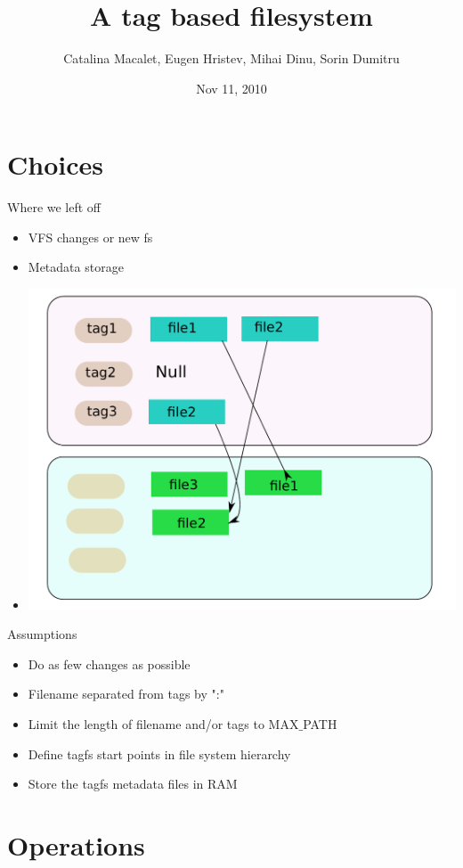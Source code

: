 \documentclass{beamer}
\title[TagFS]{A tag based filesystem}
\author{Catalina Macalet, Eugen Hristev, Mihai Dinu, Sorin Dumitru}
\institute{Politehnic University of Bucharest}
\date{Nov 11, 2010}
\begin{document}
\begin{frame}
  \titlepage
\end{frame}

\section{Choices}

\begin{frame}{Where we left off}
    \begin{itemize}
        \item{VFS changes or new fs}
        \item{Metadata storage}
	\item{\includegraphics[scale=0.4]{poza.pdf}}
    \end{itemize}
\end{frame}

\begin{frame}{Assumptions}
    \begin{itemize}
        \item{Do as few changes as possible}
        \item{Filename separated from tags by ":"}
        \item{Limit the length of filename and/or tags to MAX$\_$PATH}
        \item{Define tagfs start points in file system hierarchy}
        \item{Store the tagfs metadata files in RAM}
    \end{itemize}
\end{frame}

\section{Operations}
\end{document}
